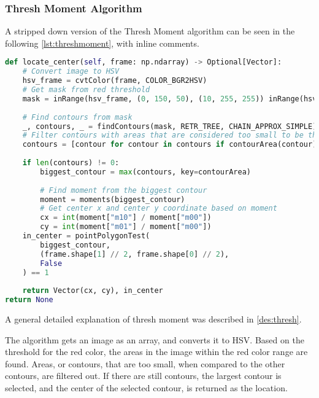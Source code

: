 \subsubsection{Thresh Moment Algorithm}\label{solution:thresh_moment}
A stripped down version of the Thresh Moment algorithm can be seen in the following \autoref{lst:threshmoment}, with inline comments.

\begin{lstlisting}[language=Python,label={lst:threshmoment},caption={Stripped down version of thresh moment from thresh\_moment.py}]
def locate_center(self, frame: np.ndarray) -> Optional[Vector]:
	# Convert image to HSV
	hsv_frame = cvtColor(frame, COLOR_BGR2HSV)
	# Get mask from red threshold
	mask = inRange(hsv_frame, (0, 150, 50), (10, 255, 255)) inRange(hsv_frame, (170, 150, 50), (180, 255, 255))
	
	# Find contours from mask
	_, contours, _ = findContours(mask, RETR_TREE, CHAIN_APPROX_SIMPLE)
	# Filter contours with areas that are considered too small to be the target
	contours = [contour for contour in contours if contourArea(contour) > 20]
	
	if len(contours) != 0:
		biggest_contour = max(contours, key=contourArea)
		
		# Find moment from the biggest contour
		moment = moments(biggest_contour)
		# Get center x and center y coordinate based on moment
		cx = int(moment["m10"] / moment["m00"])
		cy = int(moment["m01"] / moment["m00"])
	in_center = pointPolygonTest(
		biggest_contour,
		(frame.shape[1] // 2, frame.shape[0] // 2),
		False
	) == 1
	
	return Vector(cx, cy), in_center
return None
\end{lstlisting}

A general detailed explanation of thresh moment was described in \autoref{des:thresh}.

The algorithm gets an image as an array, and converts it to HSV.
Based on the threshold for the red color, the areas in the image within the red color range are found. 
Areas, or contours, that are too small, when compared to the other contours, are filtered out.
If there are still contours, the largest contour is selected, and the center of the selected contour, is returned as the location.